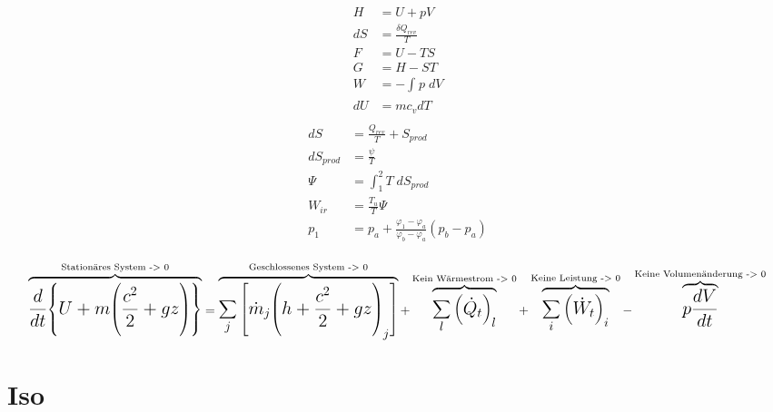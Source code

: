 \documentclass[twocolumn]{article}
\begin{document}
\begin{multicols}{2}
\begin{align*}
	H 	&=	U + pV 				\\ 	
       	dS 	&=	\frac{\delta Q_{rev}}{T}	\\
	F 	&=	U-TS 				\\
	G 	&=	H-ST	\\
	W 	&=	-\int_{}^{} p\; dV		\\
	dU	&= 	mc_vdT 				\\
	\end{align*}
	\begin{align*}
       	dS 		&=  	\frac{Q_{rev}}{T} + S_{prod}	\\
	dS_{prod}	&=	\frac{\psi}{T} 			\\
	\Psi 		&= 	\int_{1}^{2} T\; dS_{prod}	\\
	W_{ir}		&=	\frac{T_u}{T}\Psi		\\
	p_1 		&= p_a  + \frac{\varphi_1 - \varphi_a}{\varphi_b- \varphi_a}(p_b - p_a) \\
\end{align*}
\end{multicols}

\begin{equation*}
\Large
	\overbrace{
	\frac{d}{dt}\Bigg{\{} U 
	+
	m \Bigg{(}\frac{c^2}{2}+gz\Bigg{)}\Bigg{\}}}
	^{\text{Stationäres System -> 0}} 
	=
	\overbrace{
	\sum_{j}{\Bigg{[}\dot{m}_j\Bigg{(}h+\frac{c^2}{2}+gz\Bigg{)}_j \Bigg{]}}}
	^{\text{Geschlossenes System -> 0}}  
	+
	\overbrace{
	\sum_{l}^{} \Big(\dot{Q}_t\Big)_l}
	^{\text{Kein Wärmestrom -> 0}} 
	+
	\overbrace{
	\sum_{i}\Big(\dot{W}_t\Big)_i}
	^{\text{Keine Leistung -> 0}}
	-
	\overbrace{
	p\frac{dV}{dt}}
	^{\text{Keine Volumenänderung -> 0}}
\end{equation*}

%                 
\section{Iso}
\end{document}
